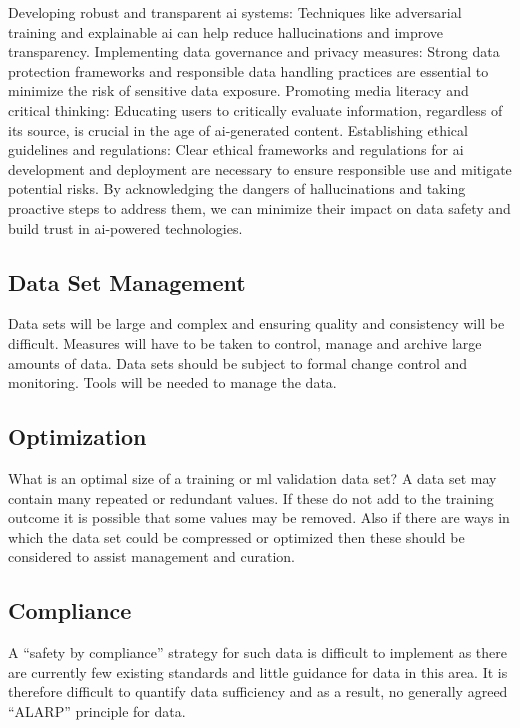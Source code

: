 \begin{aibox}
Developing robust and transparent \gls{ai} systems: Techniques like adversarial training and explainable \gls{ai} can help reduce hallucinations and improve transparency.
Implementing data governance and privacy measures: Strong data protection frameworks and responsible data handling practices are essential to minimize the risk of sensitive data exposure.
Promoting media literacy and critical thinking: Educating users to critically evaluate information, regardless of its source, is crucial in the age of \gls{ai}-generated content.
Establishing ethical guidelines and regulations: Clear ethical frameworks and regulations for \gls{ai} development and deployment are necessary to ensure responsible use and mitigate potential risks.
By acknowledging the dangers of hallucinations and taking proactive steps to address them, we can minimize their impact on data safety and build trust in \gls{ai}-powered technologies.
\end{aibox}

\subsection{Data Set Management}
Data sets will be large and complex and ensuring quality and consistency will be difficult. Measures will have to be taken to control, manage and archive large amounts of data. Data sets should be subject to formal change control and monitoring. Tools will be needed to manage the data.

\subsection{Optimization}
What is an optimal size of a training or
\gls{ml}
validation data set? A data set may contain many repeated or redundant values. If these do not add to the training outcome it is possible that some values may be removed. Also if there are ways in which the data set could be compressed or optimized then these should be considered to assist management and curation.

\subsection{Compliance}
A ``safety by compliance'' strategy for such data is difficult to implement as there are currently
few existing standards and little guidance for data in this area.
It is therefore difficult to quantify data sufficiency and as a result, no generally agreed ``ALARP'' principle for data.

